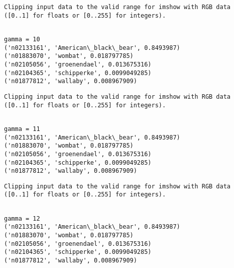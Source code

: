 \documentclass[11pt]{article}
\begin{document}
    \begin{Verbatim}[commandchars=\\\{\}]
Clipping input data to the valid range for imshow with RGB data ([0..1] for floats or [0..255] for integers).

    \end{Verbatim}

    \begin{Verbatim}[commandchars=\\\{\}]

gamma = 10
('n02133161', 'American\_black\_bear', 0.8493987)
('n01883070', 'wombat', 0.018797785)
('n02105056', 'groenendael', 0.013675316)
('n02104365', 'schipperke', 0.0099049285)
('n01877812', 'wallaby', 0.008967909)

    \end{Verbatim}

    \begin{Verbatim}[commandchars=\\\{\}]
Clipping input data to the valid range for imshow with RGB data ([0..1] for floats or [0..255] for integers).

    \end{Verbatim}

    \begin{Verbatim}[commandchars=\\\{\}]

gamma = 11
('n02133161', 'American\_black\_bear', 0.8493987)
('n01883070', 'wombat', 0.018797785)
('n02105056', 'groenendael', 0.013675316)
('n02104365', 'schipperke', 0.0099049285)
('n01877812', 'wallaby', 0.008967909)

    \end{Verbatim}

    \begin{Verbatim}[commandchars=\\\{\}]
Clipping input data to the valid range for imshow with RGB data ([0..1] for floats or [0..255] for integers).

    \end{Verbatim}

    \begin{Verbatim}[commandchars=\\\{\}]

gamma = 12
('n02133161', 'American\_black\_bear', 0.8493987)
('n01883070', 'wombat', 0.018797785)
('n02105056', 'groenendael', 0.013675316)
('n02104365', 'schipperke', 0.0099049285)
('n01877812', 'wallaby', 0.008967909)

    \end{Verbatim}
\end{document}
